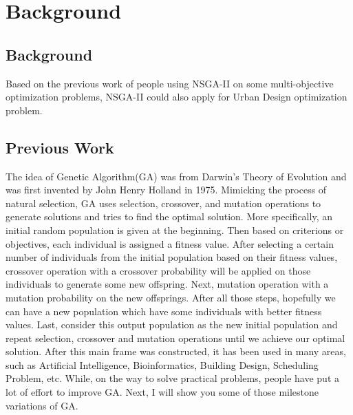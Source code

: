 \chapter{Background}
\label{chap:background}

\section{Background}
Based on the previous work of people using NSGA-II on some multi-objective optimization problems\cite{Magnier_2010_Multiobjective}, NSGA-II could also apply for Urban Design optimization problem. 

\section{Previous Work}

The idea of Genetic Algorithm(GA) was from Darwin's Theory of Evolution and was first invented by John Henry Holland in 1975\cite{Holland_1975_Book}. Mimicking the process of natural selection, GA uses selection, crossover, and mutation operations to generate solutions and tries to find the optimal solution. More specifically, an initial random population is given at the beginning. Then based on criterions or objectives, each individual is assigned a fitness value. After selecting a certain number of individuals from the initial population based on their fitness values, crossover operation with a crossover probability will be applied on those individuals to generate some new offspring. Next, mutation operation with a mutation probability on the new offsprings. After all those steps, hopefully we can  have a new population which have some individuals with better fitness values. Last, consider this output population as the new initial population and repeat selection, crossover and mutation operations until we achieve our optimal solution. After this main frame was constructed, it has been used in many areas, such as Artificial Intelligence, Bioinformatics, Building Design, Scheduling Problem, etc. While, on the way to solve practical problems, people have put a lot of effort to improve GA. Next, I will show you some of those milestone variations of GA. 

